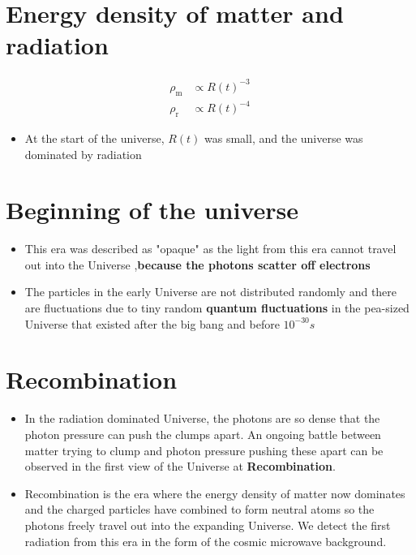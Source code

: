 \documentclass{article}
\begin{document}
\section{Energy density of matter and radiation}
\begin{align}
\rho_\text{m} &\propto {R(t)}^{-3}\\
\rho_\text{r} &\propto {R(t)}^{-4}
\end{align}
\begin{itemize}
\item At the start of the universe, $R(t)$ was small, and the universe was dominated by radiation
\end{itemize}
\section{Beginning of the universe}
\begin{itemize}
\item This era was described as "opaque" as the light from this era cannot travel out into the Universe ,\textbf{because the photons scatter off electrons}
\item The particles in the early Universe are not distributed randomly and
there are fluctuations due to tiny random \textbf{quantum fluctuations}
in the pea-sized Universe that existed after the big bang and before $10^{-30}s$
\end{itemize}
\section{Recombination}
\begin{itemize}
\item In the radiation dominated Universe, the photons are so dense that the
photon pressure can push the clumps apart. An ongoing battle between matter trying to clump
and photon pressure pushing these apart can be observed in the first view of the Universe at
\textbf{Recombination}.
\item Recombination is the era where the energy density of matter now dominates and the charged
particles have combined to form neutral atoms so the photons freely travel out into the expanding
Universe. We detect the first radiation from this era in the form of the cosmic microwave
background.
\end{itemize}
\end{document}
